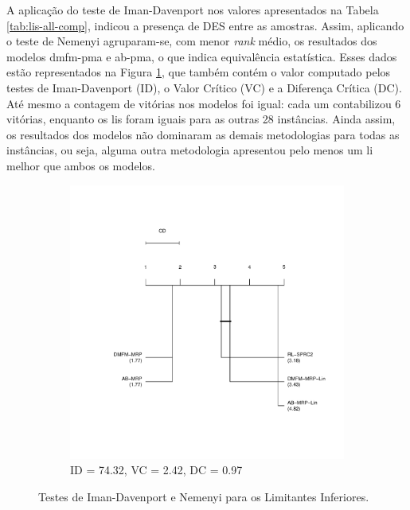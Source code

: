 A  aplicação do  teste  de  Iman-Davenport nos  valores  apresentados na  Tabela
\ref{tab:lis-all-comp},  indicou a  presença de  DES entre  as amostras.  Assim,
aplicando  o teste  de  Nemenyi agruparam-se,  com menor  {\em  rank} médio,  os
resultados dos modelos \gls{dmfm-pma} e  \gls{ab-pma}, o que indica equivalência
estatística.     Esses      dados     estão     representados      na     Figura
\ref{fig:all-lis-nemenyi}, que também  contém o valor computado  pelos testes de
Iman-Davenport (ID), o Valor Crítico (VC)  e a Diferença Crítica (DC). Até mesmo
a contagem de  vitórias nos modelos foi igual: cada  um contabilizou 6 vitórias,
enquanto os \gls{li}s foram iguais para as outras 28 instâncias. Ainda assim, os
resultados  dos modelos  não  dominaram  as demais  metodologias  para todas  as
instâncias, ou seja, alguma outra  metodologia apresentou pelo menos um \gls{li}
melhor que ambos os modelos.

\begin{figure}[!ht]
    \centering
    \begin{subfigure}{.5\textwidth}
        \centering
        \includegraphics[scale=0.6]{imagens/lis-all.pdf}
        \vspace*{-2cm}
        \caption{ID = 74.32, VC = 2.42, DC = 0.97}
    \end{subfigure}
    \caption{Testes de Iman-Davenport e Nemenyi para os Limitantes Inferiores.}
    \label{fig:all-lis-nemenyi}
\end{figure}

